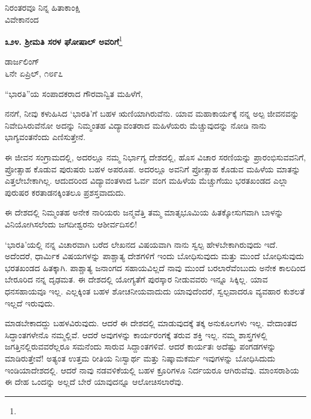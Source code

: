 \vspace{-0.5cm}

{\flushright
ನಿರಂತರವೂ ನಿನ್ನ ಹಿತಾಕಾಂಕ್ಷಿ\\ವಿವೇಕಾನಂದ\par}

\begin{center}
\textbf{೩೨೪. ಶ‍್ರೀಮತಿ ಸರಳ ಘೋಷಾಲ್ ಅವರಿಗೆ}\footnote{}
\end{center}

\vspace{-0.7cm}

\begin{flushright}
ಡಾರ್ಜಲಿಂಗ್\\೬ನೇ ಏಪ್ರಿಲ್, ೧೮೯೭
\end{flushright}

\vspace{-0.3cm}

\noindent
“ಭಾರತಿ”ಯ ಸಂಪಾದಕರಾದ ಗೌರವಾನ್ವಿತ ಮಹಿಳೆಗೆ,

ನನಗೆ, ನೀವು ಕಳುಹಿಸಿದ ‘ಭಾರತಿ’ಗೆ ಬಹಳ ಋಣಿಯಾಗಿರುವೆನು. ಯಾವ ಮಹಾಕಾರ್ಯಕ್ಕೆ ನನ್ನ ಅಲ್ಪ ಜೀವನವನ್ನು ನಿವೇದಿಸಿರುವೆನೋ ಅದನ್ನು ನಿಮ್ಮಂತಹ ವಿದ್ಯಾವಂತರಾದ ಮಹಿಳೆಯರು ಮೆಚ್ಚುವುದನ್ನು ನೋಡಿ ನಾನು ಭಾಗ್ಯವಂತನೆಂದು ಎಣಿಸುತ್ತೇನೆ.

ಈ ಜೀವನ ಸಂಗ್ರಾಮದಲ್ಲಿ, ಅದರಲ್ಲೂ ನಮ್ಮ ನಿರ್ಭಾಗ್ಯ ದೇಶದಲ್ಲಿ, ಹೊಸ ವಿಚಾರ ಸರಣಿಯನ್ನು ಪ್ರಾರಂಭಿಸುವವನಿಗೆ, ಪ್ರೋತ್ಸಾಹ ಕೊಡುವ ಪುರುಷರು ಬಹಳ ಅಪರೂಪ. ಅದರಲ್ಲೂ ಅವನಿಗೆ ಪ್ರೋತ್ಸಾಹ ಕೊಡುವ ಮಹಿಳೆಯ ಮಾತನ್ನು ಎತ್ತಲೇಬೇಕಾಗಿಲ್ಲ. ಆದುದರಿಂದ ವಿದ್ಯಾವಂತಳಾದ ಓರ್ವ ವಂಗ ಮಹಿಳೆಯ ಮೆಚ್ಚುಗೆಯು ಭರತಖಂಡದ ಎಲ್ಲಾ ಪುರುಷರ ಕರತಾಡನಕ್ಕಿಂತಲೂ ಪ್ರಶಸ್ತವಾದುದು.

ಈ ದೇಶದಲ್ಲಿ ನಿಮ್ಮಂತಹ ಅನೇಕ ನಾರಿಯರು ಜನ್ಮವೆತ್ತಿ ತಮ್ಮ ಮಾತೃಭೂಮಿಯ ಹಿತಕ್ಕೋಸುಗವಾಗಿ ಬಾಳನ್ನು ವಿನಿಯೋಗಿಸಲೆಂದು ಜಗದೀಶ್ವರನು ಆಶೀರ್ವದಿಸಲಿ!

‘ಭಾರತಿ’ಯಲ್ಲಿ ನನ್ನ ವಿಚಾರವಾಗಿ ಬರೆದ ಲೇಖನದ ವಿಷಯವಾಗಿ ನಾನು ಸ್ವಲ್ಪ ಹೇಳಬೇಕಾಗಿರುವುದು ಇದೆ. ಅದೆಂದರೆ, ಧಾರ್ಮಿಕ ವಿಷಯಗಳನ್ನು ಪಾಶ್ಚಾತ್ಯ ದೇಶಗಳಿಗೆ ಇಂದು ಬೋಧಿಸುವುದು ಮತ್ತು ಮುಂದೆ ಬೋಧಿಸುವುದು ಭರತಖಂಡದ ಹಿತಕ್ಕಾಗಿ. ಪಾಶ್ಚಾತ್ಯ ಜನಾಂಗದ ಸಹಾಯವಿಲ್ಲದೆ ನಾವು ಮುಂದೆ ಬರಲಾರೆವೆಂಬುದು ಅನೇಕ ಕಾಲದಿಂದ ಬೇರೂರಿದ ನನ್ನ ದೃಢಮತ. ಈ ದೇಶದಲ್ಲಿ ಯೋಗ್ಯತೆಗೆ ಪುರಸ್ಕಾರ ನೀಡುವವರು ಇನ್ನೂ ಸಿಕ್ಕಿಲ್ಲ. ಯಾವ ಧನಸಹಾಯವೂ ಇಲ್ಲ. ಎಲ್ಲಕ್ಕಿಂತ ಬಹಳ ಶೋಚನೀಯವಾದುದು ಯಾವುದೆಂದರೆ, ಸ್ವಲ್ಪವಾದರೂ ವ್ಯವಹಾರ ಕುಶಲತೆ ಇಲ್ಲದೆ ಇರುವುದು.

ಮಾಡಬೇಕಾದದ್ದು ಬಹಳವಿರುವುದು. ಆದರೆ ಈ ದೇಶದಲ್ಲಿ ಮಾಡುವುದಕ್ಕೆ ತಕ್ಕ ಅನುಕೂಲಗಳು ಇಲ್ಲ. ವೇದಾಂತದ ಸಿದ್ಧಾಂತಗಳೇನೊ ನಮ್ಮಲ್ಲಿವೆ. ಆದರೆ ಅವುಗಳನ್ನು ಕಾರ್ಯರಂಗಕ್ಕೆ ತರುವ ಶಕ್ತಿ ಇಲ್ಲ. ನಮ್ಮ ಶಾಸ್ತ್ರಗಳಲ್ಲಿ ಜಗತ್ತಿನಲ್ಲಿರುವವರೆಲ್ಲರೂ ಸಮನೆಂದು ಸಾರುವ ಸಿದ್ದಾಂತಗಳಿವೆ. ಆದರೆ ಕಾರ್ಯತಃ ಅದೆಷ್ಟು ಪಂಗಡಗಳನ್ನು ಮಾಡಿರುತ್ತೇವೆ! ಅತ್ಯಂತ ಉತ್ತಮ ರೀತಿಯ ನಿಃಸ್ವಾರ್ಥ ಮತ್ತು ನಿಷ್ಕಾಮಕರ್ಮ ಇವುಗಳನ್ನು ಬೋಧಿಸಿದುದು ಇಂಡಿಯಾದೇಶದಲ್ಲಿ. ಆದರೆ ನಾವು ನಡವಳಿಕೆಯಲ್ಲಿ ಬಹಳ ಕ್ರೂರಿಗಳೂ ನಿರ್ದಯರೂ ಆಗಿರುವೆವು. ಮಾಂಸರಾಶಿಯ ಈ ದೇಹ ಒಂದನ್ನು ಅಲ್ಲದೆ ಬೇರೆ ಯಾವುದನ್ನೂ ಆಲೋಚಿಸಲಾರೆವು.

